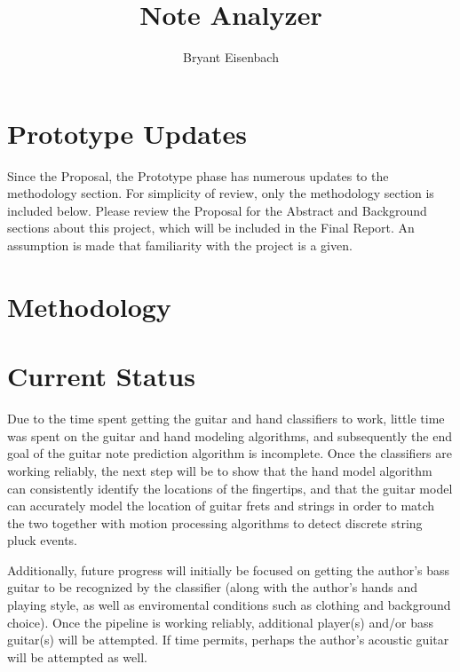 \documentclass[titlepage]{article}
\author{Bryant Eisenbach}
\title{Note Analyzer}
\begin{document}
%

\section{Prototype Updates}
Since the Proposal, the Prototype phase has numerous updates to the methodology section.
For simplicity of review, only the methodology section is included below.
Please review the Proposal for the Abstract and Background sections about this project,
which will be included in the Final Report.
An assumption is made that familiarity with the project is a given.

\section{Methodology}


\pagebreak
\section{Current Status}
Due to the time spent getting the guitar and hand classifiers to work,
little time was spent on the guitar and hand modeling algorithms,
and subsequently the end goal of the guitar note prediction algorithm is incomplete.
Once the classifiers are working reliably, the next step will be to show that
the hand model algorithm can consistently identify the locations of the fingertips,
and that the guitar model can accurately model the location of guitar frets and strings
in order to match the two together with motion processing algorithms to detect discrete
string pluck events.

Additionally, future progress will initially be focused on getting the
author's bass guitar to be recognized by the classifier
(along with the author's hands and playing style, as well as enviromental conditions such as clothing and background choice).
Once the pipeline is working reliably, additional player(s) and/or bass guitar(s) will
be attempted. If time permits, perhaps the author's acoustic guitar will be attempted as well.

{}

\end{document}
